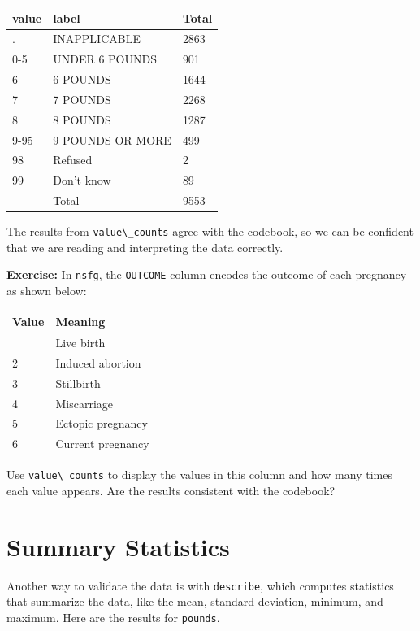\begin{longtable}[]{@{}lll@{}}
\midrule\noalign{}
value & label & Total \\
\midrule\noalign{}
\endhead
\midrule\noalign{}
\endlastfoot
. & INAPPLICABLE & 2863 \\
0-5 & UNDER 6 POUNDS & 901 \\
6 & 6 POUNDS & 1644 \\
7 & 7 POUNDS & 2268 \\
8 & 8 POUNDS & 1287 \\
9-95 & 9 POUNDS OR MORE & 499 \\
98 & Refused & 2 \\
99 & Don't know & 89 \\
& Total & 9553 \\
\end{longtable}

The results from \passthrough{\lstinline!value\_counts!} agree with the
codebook, so we can be confident that we are reading and interpreting
the data correctly.

\textbf{Exercise:} In \passthrough{\lstinline!nsfg!}, the
\passthrough{\lstinline!OUTCOME!} column encodes the outcome of each
pregnancy as shown below:

\begin{longtable}[]{@{}ll@{}}
\midrule\noalign{}
Value & Meaning \\
\midrule\noalign{}
\endhead
\midrule\noalign{}
\endlastfoot
1 & Live birth \\
2 & Induced abortion \\
3 & Stillbirth \\
4 & Miscarriage \\
5 & Ectopic pregnancy \\
6 & Current pregnancy \\
\end{longtable}

Use \passthrough{\lstinline!value\_counts!} to display the values in
this column and how many times each value appears. Are the results
consistent with the codebook?

\section{Summary Statistics}\label{summary-statistics}

Another way to validate the data is with
\passthrough{\lstinline!describe!}, which computes statistics that
summarize the data, like the mean, standard deviation, minimum, and
maximum. Here are the results for \passthrough{\lstinline!pounds!}.

